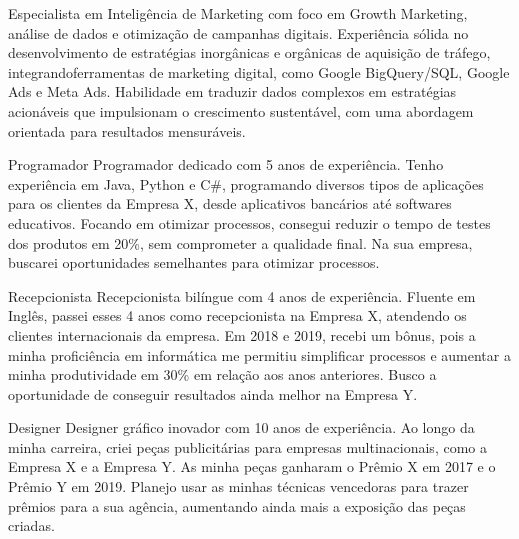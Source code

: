 Especialista em Inteligência de Marketing com foco em Growth Marketing, análise de dados e otimização de campanhas digitais. Experiência sólida no desenvolvimento de estratégias inorgânicas e orgânicas de aquisição de tráfego, integrandoferramentas de marketing digital, como Google BigQuery/SQL, Google Ads e Meta Ads. Habilidade em traduzir dados complexos em estratégias acionáveis que impulsionam o crescimento sustentável, com uma abordagem orientada para resultados mensuráveis.
\begin{commentA} \vspace{0.3cm} \noindent 
Programador
Programador dedicado com 5 anos de experiência. Tenho experiência em Java, Python e C#, programando diversos tipos de aplicações para os clientes da Empresa X, desde aplicativos bancários até softwares educativos. Focando em otimizar processos, consegui reduzir o tempo de testes dos produtos em 20\%, sem comprometer a qualidade final. Na sua empresa, buscarei oportunidades semelhantes para otimizar processos.
\par \vspace{0.1cm} \end{commentA}
\begin{commentA} \vspace{0.3cm} \noindent 
Recepcionista
Recepcionista bilíngue com 4 anos de experiência. Fluente em Inglês, passei esses 4 anos como recepcionista na Empresa X, atendendo os clientes internacionais da empresa. Em 2018 e 2019, recebi um bônus, pois a minha proficiência em informática me permitiu simplificar processos e aumentar a minha produtividade em 30\% em relação aos anos anteriores. Busco a oportunidade de conseguir resultados ainda melhor na Empresa Y.
\par \vspace{0.1cm} \end{commentA}
\begin{commentA} \vspace{0.3cm} \noindent 
Designer
Designer gráfico inovador com 10 anos de experiência. Ao longo da minha carreira, criei peças publicitárias para empresas multinacionais, como a Empresa X e a Empresa Y. As minha peças ganharam o Prêmio X em 2017 e o Prêmio Y em 2019. Planejo usar as minhas técnicas vencedoras para trazer prêmios para a sua agência, aumentando ainda mais a exposição das peças criadas.
\par \vspace{0.1cm} \end{commentA}
